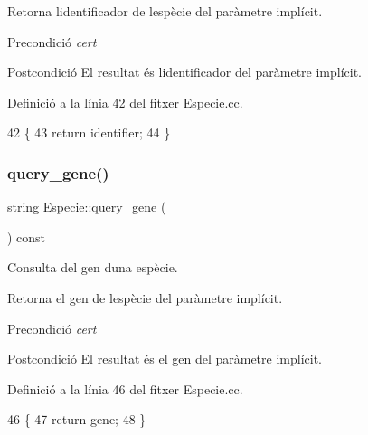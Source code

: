 Retorna l\textquotesingle{}identificador de l\textquotesingle{}espècie del paràmetre implícit.

\begin{DoxyPrecond}{Precondició}
{\itshape cert} 
\end{DoxyPrecond}
\begin{DoxyPostcond}{Postcondició}
El resultat és l\textquotesingle{}identificador del paràmetre implícit. 
\end{DoxyPostcond}


Definició a la línia 42 del fitxer Especie.\+cc.


\begin{DoxyCode}
42                                       \{
43     \textcolor{keywordflow}{return} identifier;
44 \}
\end{DoxyCode}
\mbox{\label{class_especie_a0781a594e45e036c0b59d161a7ebd8f3}} 
\subsubsection{\texorpdfstring{query\+\_\+gene()}{query\_gene()}}
{\footnotesize\ttfamily string Especie\+::query\+\_\+gene (\begin{DoxyParamCaption}{ }\end{DoxyParamCaption}) const}



Consulta del gen d\textquotesingle{}una espècie. 

Retorna el gen de l\textquotesingle{}espècie del paràmetre implícit.

\begin{DoxyPrecond}{Precondició}
{\itshape cert} 
\end{DoxyPrecond}
\begin{DoxyPostcond}{Postcondició}
El resultat és el gen del paràmetre implícit. 
\end{DoxyPostcond}


Definició a la línia 46 del fitxer Especie.\+cc.


\begin{DoxyCode}
46                                 \{
47     \textcolor{keywordflow}{return} gene;
48 \}
\end{DoxyCode}
\mbox{\label{class_especie_ab446000c51668cabe39fb2b72ed5fff0}} 
